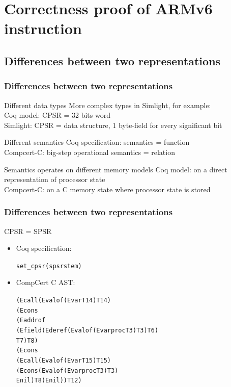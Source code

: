 \documentclass{beamer} %
\begin{document}
\section{Correctness proof of ARMv6 instruction}



\subsection{Differences between two representations}
\begin{frame}
\frametitle{Differences between two representations}
\begin{block}{Different data types}
More complex types in Simlight, for example:\\
Coq model: CPSR = 32 bits word\\
Simlight: CPSR = data structure, 1 byte-field for every significant bit
\end{block}
\begin{block}{Different semantics}
Coq specification: semantics = function\\
Compcert-C: big-step operational semantics = relation
\end{block}
\begin{block}{Semantics operates on different memory models}
Coq model: on a direct representation of processor state\\
Compcert-C: on a C memory state where processor state is stored
\end{block}
\end{frame}

\begin{frame}[fragile]
\frametitle{Differences between two representations}
\begin{block}{CPSR = SPSR}
\begin{itemize}
\item Coq specification:
\begin{alltt}
set_cpsr (spsr st em)
\end{alltt}
\item CompCert C AST:
\begin{alltt}\small
(Ecall (Evalof (Evar  T14) T14)
   (Econs
      (Eaddrof
         (Efield (Ederef (Evalof (Evar proc T3) T3) T6) 
                  T7) T8)
            (Econs
               (Ecall (Evalof (Evar  T15) T15)
                  (Econs (Evalof (Evar proc T3) T3) 
                   Enil) T8) Enil)) T12)
\end{alltt}
\end{itemize}
\end{block}
\end{frame}
\end{document}
